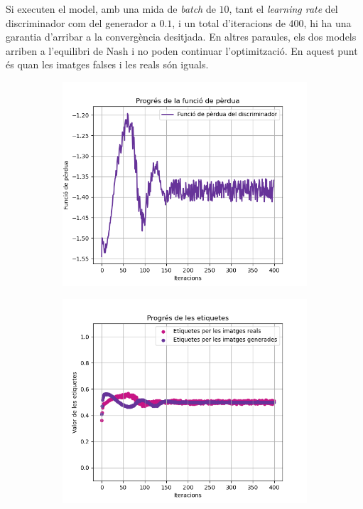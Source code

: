 Si executen el model, amb una mida de \textit{batch} de $10$, tant el \textit{learning rate} del discriminador com del generador a $0.1$, i un total d'iteracions de $400$, hi ha una garantia d'arribar a la convergència desitjada. En altres paraules, els dos models arriben a l'equilibri de Nash i no poden continuar l'optimització. En aquest punt és quan les imatges falses i les reals són iguals.
\begin{figure}[H]
	\label{fig:labels_loss_400}
	\begin{subfigure}{0.5\textwidth}
		\includegraphics[width=\linewidth]{figures/model/loss_plot.png}
		\caption{}
		\label{fig:loss_400}
	\end{subfigure}
	\begin{subfigure}{0.5\textwidth}
		\includegraphics[width=\linewidth]{figures/model/labels_plot.png}

\end{subfigure}
\end{figure}
